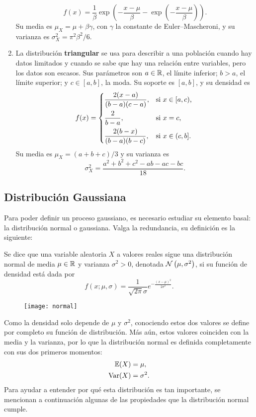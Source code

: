 \begin{enumerate}
	\[f(x) = \frac{1}{\beta} \exp(-\frac{x-\mu}{\beta} - \exp(-\frac{x-\mu}{\beta})).\]
	Su media es \(\mu_X = \mu + \beta \gamma\), con \(\gamma\) la constante de Euler--Mascheroni, y su varianza es \(\sigma_X^2 = \pi^2 \beta^2 / 6\).
	\item La distribución \textbf{triangular} se usa para describir a una población cuando hay datos limitados y cuando se sabe que hay una relación entre variables, pero los datos son escasos. Sus parámetros son \(a \in \mathbb{R}\), el límite inferior; \(b > a\), el límite superior; y \(c \in [a, b]\), la moda. Su soporte es \([a, b]\), y su densidad es
	\[f(x) = \begin{dcases*}
		\frac{2(x-a)}{(b-a)(c-a)},	& si \(x \in [a, c)\),\\
		\frac{2}{b-a},				& si \(x = c\),\\
		\frac{2(b-x)}{(b-a)(b-c)},	& si \(x \in (c, b]\).
	\end{dcases*}\]
	Su media es \(\mu_X = (a+b+c) / 3\) y su varianza es
	\[\sigma^2_X = \frac{a^2 + b^2 + c^2 - ab - ac - bc}{18}.\]
\end{enumerate}

\subsection{Distribución Gaussiana}

Para poder definir un proceso gaussiano, es necesario estudiar su elemento basal: la distribución normal o gaussiana. Valga la redundancia, su definición es la siguiente:
\begin{definition}
	Se dice que una variable aleatoria \(X\) a valores reales sigue una distribución normal de media \(\mu \in \mathbb{R}\) y varianza \(\sigma^2 > 0\), denotada \(\mathcal{N} \left(\mu, \sigma^2\right)\), si su función de densidad está dada por
	\[ f( x; \mu, \sigma) = \frac{1}{\sqrt{2\pi} \sigma} e^{-\frac{(x - \mu)^2}{2\sigma^2}}.\]
\end{definition}

\begin{figure}[h]
	\centering
	\texttt{[image: normal]}
\end{figure}

Como la densidad solo depende de \(\mu\) y \(\sigma^2\), conociendo estos dos valores se define por completo su función de distribución. Más aún, estos valores coinciden con la media y la varianza, por lo que la distribución normal es definida completamente con sus dos primeros momentos:
\begin{align*}
	\mathbb{E}(X)		&= \mu,\\
	\operatorname{Var}(X)	&= \sigma^2.
\end{align*}
Para ayudar a entender por qué esta distribución es tan importante, se mencionan a continuación algunas de las propiedades que la distribución normal cumple.

